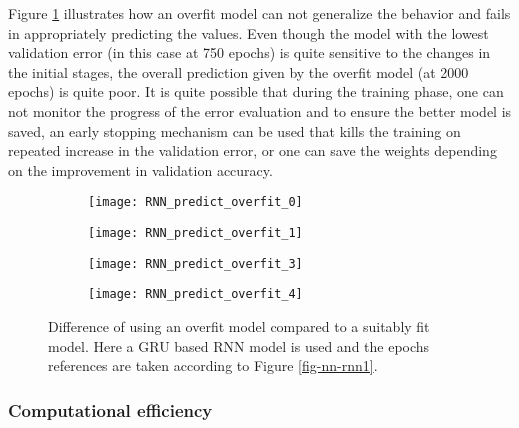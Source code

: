Figure \ref{fig-nn-rnn8} illustrates how an overfit model can not generalize the behavior and fails in appropriately predicting the values. Even though the model with the lowest validation error (in this case at 750 epochs) is quite sensitive to the changes in the initial stages, the overall prediction given by the overfit model (at 2000 epochs) is quite poor. It is quite possible that during the training phase, one can not monitor the progress of the error evaluation and to ensure the better model is saved, an early stopping mechanism can be used that kills the training on repeated increase in the validation error, or one can save the weights depending on the improvement in validation accuracy.

\begin{figure}
	\centering
	\begin{subfigure}[t]{0.45\textwidth}
		\texttt{[image: RNN\_predict\_overfit\_0]}
	\end{subfigure}
	\begin{subfigure}[t]{0.45\textwidth}
		\texttt{[image: RNN\_predict\_overfit\_1]}
	\end{subfigure}
	\begin{subfigure}[t]{0.45\textwidth}
		\texttt{[image: RNN\_predict\_overfit\_3]}
	\end{subfigure}
	\begin{subfigure}[t]{0.45\textwidth}
		\texttt{[image: RNN\_predict\_overfit\_4]}
	\end{subfigure}
	\caption{Difference of using an overfit model compared to a suitably fit model. Here a GRU based RNN model is used and the epochs references are taken according to Figure \ref{fig-nn-rnn1}.}\label{fig-nn-rnn8}
\end{figure}


\subsubsection{Computational efficiency} 

